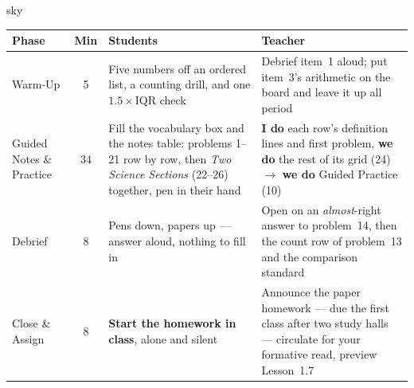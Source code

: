\documentclass[10pt]{article}
\begin{document}
\boxguard[30]
\begin{skillbox}{sky}
\renewcommand{\arraystretch}{1.25}
\begin{tabularx}{\linewidth}{@{}l c X X@{}}
\textbf{Phase} & \textbf{Min} & \textbf{Students} & \textbf{Teacher} \\
\hline
Warm-Up & 5 & Five numbers off an ordered list, a counting drill, and one $1.5\times$IQR check &
              Debrief item~1 aloud; put item~3's arithmetic on the board and leave it up all
              period \\
Guided Notes \& Practice & 34 & Fill the vocabulary box and the notes table: problems 1--21 row
              by row, then \emph{Two Science Sections} (22--26) together, pen in their hand &
              \textbf{I do} each row's definition lines and first problem, \textbf{we do} the
              rest of its grid (24) $\to$ \textbf{we do} Guided Practice (10) \\
Debrief & 8 & Pens down, papers up --- answer aloud, nothing to fill in & Open on an
              \emph{almost}-right answer to problem~14, then the count row of problem~13 and the
              comparison standard \\
Close \& Assign & 8 & \textbf{Start the homework in class}, alone and silent & Announce the paper
              homework --- due the first class after two study halls --- circulate for your
              formative read, preview Lesson~1.7 \\
\end{tabularx}
\end{skillbox}
\end{document}
